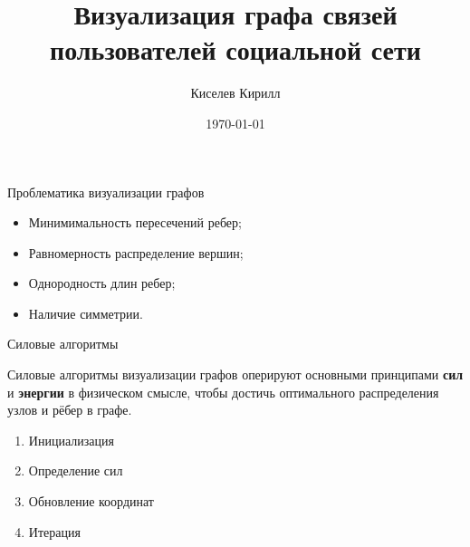 \documentclass{beamer}
\title{Визуализация графа связей пользователей социальной сети}
\date{\today}
\author{Киселев Кирилл}
\institute{МГТУ им. Н.Э. Баумана}
\begin{document}
\maketitle

\begin{frame}{Проблематика визуализации графов}

	\begin{itemize}
		\item Минимимальность пересечений ребер;
		\item Равномерность распределение вершин;
		\item Однородность длин ребер;
		\item Наличие симметрии.
	\end{itemize}


\end{frame}

\begin{frame}{Силовые алгоритмы}

	\alert{Силовые алгоритмы} визуализации графов оперируют основными принципами \textbf{сил} и \textbf{энергии} в физическом смысле, чтобы достичь оптимального распределения узлов и рёбер в графе.

	\begin{enumerate}
		\item Инициализация
		\item Определение сил
		\item Обновление координат
		\item Итерация
	\end{enumerate}


\end{frame}
\end{document}
